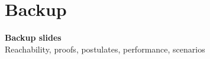 \appendix

\section*{Backup}

\begin{frame}
    \vfill
    \begin{center}
        {\Huge\bfseries Backup slides}\\[1em]
        {\large Reachability, proofs, postulates, performance, scenarios}
    \end{center}
    \vfill
\end{frame}


